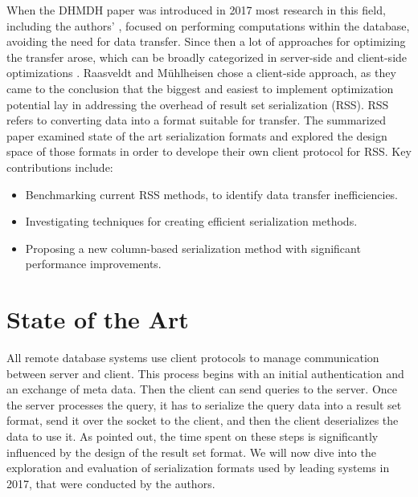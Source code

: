 \documentclass[sigconf]{acmart}
\begin{document}
When the DHMDH \cite{raasveldt2017dhmds} paper was introduced in 2017 most research in this field, including the authors' \cite{raasveldt2016vectorized}, focused on performing computations within the database, avoiding the need for data transfer. Since then a lot of approaches for optimizing the transfer arose, which can be broadly categorized in server-side and client-side optimizations \cite{wang2022connectorx}. Raasveldt and Mühlheisen chose a client-side approach, as they came to the conclusion that the biggest and easiest to implement optimization potential lay in addressing the overhead of result set serialization (RSS). RSS refers to converting data into a format suitable for transfer.
The summarized paper examined state of the art serialization formats and explored the design space of those formats in order to develope their own client protocol for RSS.
Key contributions include:
\begin{itemize}
  \item Benchmarking current RSS methods, to identify data transfer inefficiencies.
  \item Investigating techniques for creating efficient serialization methods.
  \item Proposing a new column-based serialization method with significant performance improvements.
\end{itemize}

\section{State of the Art}
All remote database systems use client protocols to manage communication between server and client. This process begins with an initial authentication and an exchange of meta data. Then the client can send queries to the server. Once the server processes the query, it has to serialize the query data into a result set format, send it over the socket to the client, and then the client deserializes the data to use it.
As pointed out, the time spent on these steps is significantly influenced by the design of the result set format. We will now dive into the exploration and evaluation of serialization formats used by leading systems in 2017, that were conducted by the authors.
\end{document}

